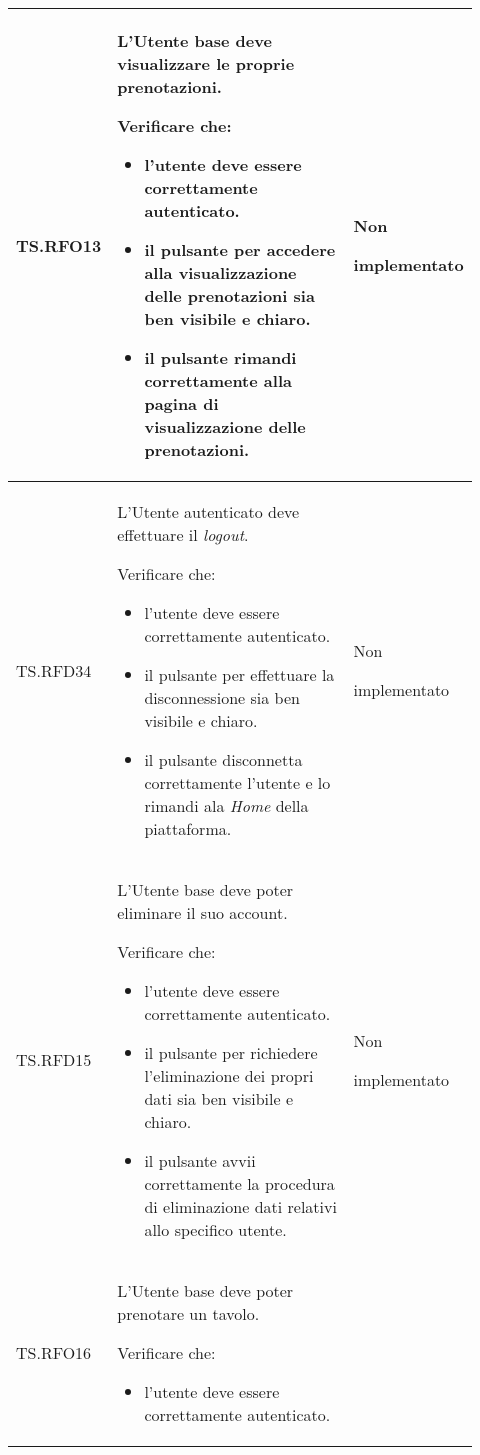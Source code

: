 \begin{longtable}{|p{0.10\linewidth}|p{0.70\linewidth}|p{0.12\linewidth}|}
    \hline
    TS.RFO13 & 
    L'Utente base deve visualizzare le proprie prenotazioni. \par 
    Verificare che: 
    \begin{itemize}
        \item l'utente deve essere correttamente autenticato.
        \item il pulsante per accedere alla visualizzazione delle prenotazioni sia ben visibile e chiaro.
        \item il pulsante rimandi correttamente alla pagina di visualizzazione delle prenotazioni.
    \end{itemize}&
    Non \par implementato  \\
    \hline
    TS.RFD34 & 
    L'Utente autenticato deve effettuare il \textit{logout}. \par
    Verificare che: 
    \begin{itemize}
        \item l'utente deve essere correttamente autenticato.
        \item il pulsante per effettuare la disconnessione sia ben visibile e chiaro.
        \item il pulsante disconnetta correttamente l'utente e lo rimandi ala \textit{Home} della piattaforma.
    \end{itemize}&
    Non \par implementato  \\
    \hline
    TS.RFD15 & 
    L’Utente base deve poter eliminare il suo account. \par 
    Verificare che: 
    \begin{itemize}
        \item l'utente deve essere correttamente autenticato.
        \item il pulsante per richiedere l'eliminazione dei propri dati sia ben visibile e chiaro.
        \item il pulsante avvii correttamente la procedura di eliminazione dati relativi allo specifico utente.
    \end{itemize}&
    Non \par implementato  \\
    \hline
    TS.RFO16 & 
    L’Utente base deve poter prenotare un tavolo.  \par 
    Verificare che: 
    \begin{itemize}
        \item l'utente deve essere correttamente autenticato.

\end{itemize}
\end{longtable}
